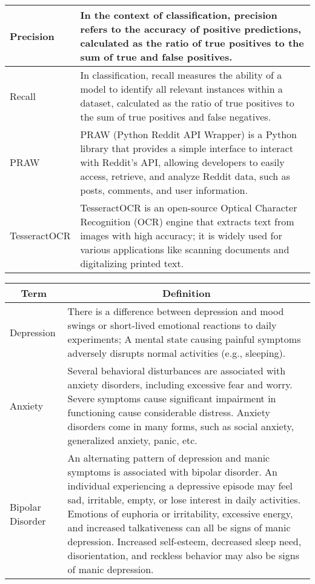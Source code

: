 \begin{center}
\begin{tabular}{|p{4cm}|p{10cm}|}
  \hline
  Precision & In the context of classification, precision refers to the accuracy of positive predictions, calculated as the ratio of true positives to the sum of true and false positives. \\

  \hline
  Recall & In classification, recall measures the ability of a model to identify all relevant instances within a dataset, calculated as the ratio of true positives to the sum of true positives and false negatives. \\
  
  \hline
  PRAW & PRAW (Python Reddit API Wrapper) is a Python library that provides a simple interface to interact with Reddit's API, allowing developers to easily access, retrieve, and analyze Reddit data, such as posts, comments, and user information. \\

  \hline
  TesseractOCR & TesseractOCR is an open-source Optical Character Recognition (OCR) engine that extracts text from images with high accuracy; it is widely used for various applications like scanning documents and digitalizing printed text. \\
  \hline

\end{tabular}

\pagebreak

\begin{tabular}{|p{4cm}|p{10cm}|}
  \hline
  \multicolumn{1}{|c|}{\textbf{Term}} & \multicolumn{1}{c|}{\textbf{Definition}} \\

  \hline
  Depression & There is a difference between depression and mood swings or short-lived emotional reactions to daily experiments; A mental state causing painful symptoms adversely disrupts normal activities (e.g., sleeping). \\

  \hline
  Anxiety & Several behavioral disturbances are associated with anxiety disorders, including excessive fear and worry. Severe symptoms cause significant impairment in functioning cause considerable distress. Anxiety disorders come in many forms, such as social anxiety, generalized anxiety, panic, etc. \\

  \hline
  Bipolar Disorder & An alternating pattern of depression and manic symptoms is associated with bipolar disorder. An individual experiencing a depressive episode may feel sad, irritable, empty, or lose interest in daily activities. Emotions of euphoria or irritability, excessive energy, and increased talkativeness can all be signs of manic depression. Increased self-esteem, decreased sleep need, disorientation, and reckless behavior may also be signs of manic depression. \\


\end{tabular}
\end{center}
